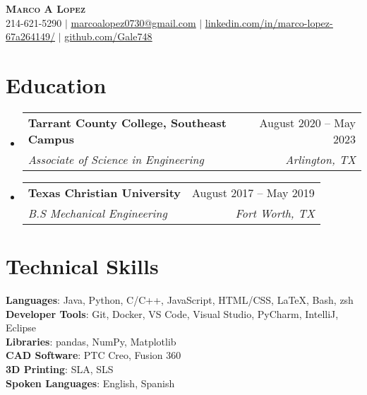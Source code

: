 \documentclass[letterpaper,11pt]{article}
\makeatletter
\newcommand{\resumeSubheading}[4]{
  \vspace{-2pt}\item
    \begin{tabular*}{0.97\textwidth}[t]{l@{\extracolsep{\fill}}r}
      \textbf{#1} & #2 \\
      \textit{\small#3} & \textit{\small #4} \\
    \end{tabular*}\vspace{-7pt}
}
\newcommand{\resumeSubHeadingListStart}{\begin{itemize}[leftmargin=0.15in, label={}]}
\newcommand{\resumeSubHeadingListEnd}{\end{itemize}}
\makeatother
\begin{document}

\begin{center}
    \textbf{\Huge \scshape Marco A Lopez} \\ \vspace{1pt}
    \small 214-621-5290 $|$ \href{mailto:x@x.com}{\underline{marcoalopez0730@gmail.com}} $|$ 
    \href{https://linkedin.com/in/marco-lopez-67a264149/}{\underline{linkedin.com/in/marco-lopez-67a264149/}} $|$
\href{https://github.com/Gale748}{\underline{github.com/Gale748}}
\end{center}


\section{Education}
  \resumeSubHeadingListStart
    \resumeSubheading
      {Tarrant County College, Southeast Campus}{August 2020 -- May 2023}
      {Associate of Science in Engineering}{Arlington, TX}
    \resumeSubheading
      {Texas Christian University}{August 2017 -- May 2019}
      {B.S Mechanical Engineering}{Fort Worth, TX}
  \resumeSubHeadingListEnd
  
\section{Technical Skills}
 \begin{itemize}[leftmargin=0.15in, label={}]
    \small{\item{
     \textbf{Languages}{: Java, Python, C/C++, JavaScript, HTML/CSS, \LaTeX, Bash, zsh} \\
     \textbf{Developer Tools}{: Git, Docker, VS Code, Visual Studio, PyCharm, IntelliJ, Eclipse} \\
     \textbf{Libraries}{: pandas, NumPy, Matplotlib}\\
     \textbf{CAD Software}{: PTC Creo, Fusion 360}\\
     \textbf{3D Printing}{: SLA, SLS}\\
     \textbf{Spoken Languages}{: English, Spanish }\\
    }}
 \end{itemize}
\end{document}

